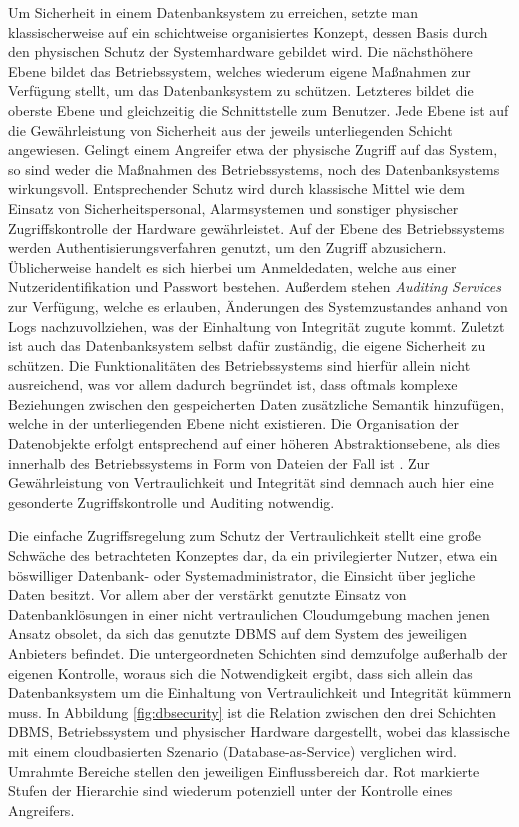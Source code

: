 Um Sicherheit in einem Datenbanksystem zu erreichen, setzte man klassischerweise auf ein schichtweise organisiertes Konzept, dessen Basis durch den physischen Schutz der Systemhardware gebildet wird. Die nächsthöhere Ebene bildet das Betriebssystem, welches wiederum eigene Maßnahmen zur Verfügung stellt, um das Datenbanksystem zu schützen. Letzteres bildet die oberste Ebene und gleichzeitig die Schnittstelle zum Benutzer. Jede Ebene ist auf die Gewährleistung von Sicherheit aus der jeweils unterliegenden Schicht angewiesen. Gelingt einem Angreifer etwa der physische Zugriff auf das System, so sind weder die Maßnahmen des Betriebssystems, noch des Datenbanksystems wirkungsvoll. Entsprechender Schutz wird durch klassische Mittel wie dem Einsatz von Sicherheitspersonal, Alarmsystemen und sonstiger physischer Zugriffskontrolle der Hardware gewährleistet. Auf der Ebene des Betriebssystems werden Authentisierungsverfahren genutzt, um den Zugriff abzusichern. Üblicherweise handelt es sich hierbei um Anmeldedaten, welche aus einer Nutzeridentifikation und Passwort bestehen. Außerdem stehen \textit{Auditing Services} zur Verfügung, welche es erlauben, Änderungen des Systemzustandes anhand von Logs nachzuvollziehen, was der Einhaltung von Integrität zugute kommt. Zuletzt ist auch das Datenbanksystem selbst dafür zuständig, die eigene Sicherheit zu schützen. Die Funktionalitäten des Betriebssystems sind hierfür allein nicht ausreichend, was vor allem dadurch begründet ist, dass oftmals komplexe Beziehungen zwischen den gespeicherten Daten zusätzliche Semantik hinzufügen, welche in der unterliegenden Ebene nicht existieren. Die Organisation der Datenobjekte erfolgt entsprechend auf einer höheren Abstraktionsebene, als dies innerhalb des Betriebssystems in Form von Dateien der Fall ist \cite{Vimercati2001}. Zur Gewährleistung von Vertraulichkeit und Integrität sind demnach auch hier eine gesonderte Zugriffskontrolle und Auditing notwendig.

Die einfache Zugriffsregelung zum Schutz der Vertraulichkeit stellt eine große Schwäche des betrachteten Konzeptes dar, da ein privilegierter Nutzer, etwa ein böswilliger Datenbank- oder Systemadministrator, die Einsicht über jegliche Daten besitzt. Vor allem aber der verstärkt genutzte Einsatz von Datenbanklösungen in einer nicht vertraulichen Cloudumgebung machen jenen Ansatz obsolet, da sich das genutzte \ac{DBMS} auf dem System des jeweiligen Anbieters befindet. Die untergeordneten Schichten sind demzufolge außerhalb der eigenen Kontrolle, woraus sich die Notwendigkeit ergibt, dass sich allein das Datenbanksystem um die Einhaltung von Vertraulichkeit und Integrität kümmern muss. In Abbildung \ref{fig:dbsecurity} ist die Relation zwischen den drei Schichten \ac{DBMS}, Betriebssystem und physischer Hardware dargestellt, wobei das klassische mit einem cloudbasierten Szenario (Database-as-Service) verglichen wird. Umrahmte Bereiche stellen den jeweiligen Einflussbereich dar. Rot markierte Stufen der Hierarchie sind wiederum potenziell unter der Kontrolle eines Angreifers.

